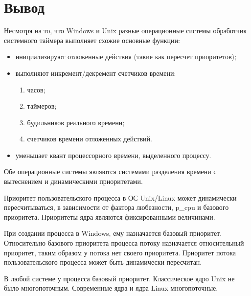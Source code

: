 \documentclass[a4paper,oneside,14pt]{extreport}
\begin{document}
\newpage

\section*{Вывод}

Несмотря на то, что Windows и Unix разные операционные системы
обработчик системного таймера выполняет
схожие основные функции:

\begin{itemize}
	\item инициализируют отложенные действия (такие как пересчет приоритетов);
	\item выполняют инкремент/декремент счетчиков времени:
	\begin{enumerate}
		\item часов;
		\item таймеров;
		\item будильников реального времени;
		\item счетчиков времени отложенных действий.
	\end{enumerate}
	\item уменьшает квант процессорного времени, выделенного процессу.
\end{itemize}

Обе операционные системы являются системами
разделения времени с вытеснением и динамическими приоритетами.

Приоритет пользовательского процесса в ОС Unix/Linux
может динамически пересчитываться, в зависимости от
фактора любезности, p\_cpu и базового приоритета. 
Приоритеты ядра являются фиксированными величинами.

При создании процесса в Windows, ему назначается базовый приоритет. 
Относительно базового приоритета процесса потоку назначается
относительный приоритет, таким образом у потока нет своего приоритета.
Приоритет потока пользовательского процесса может быть динамически пересчитан.

В любой системе у процесса базовый приоритет. 
Классическое ядро Unix не было многопоточным. 
Современные ядра и ядра Linux многопоточные.


\end{document}

